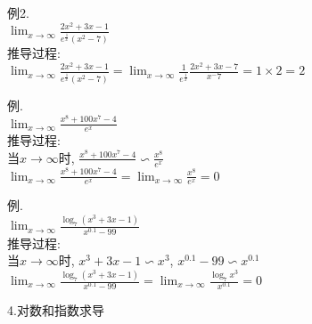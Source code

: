 例2.\\
\phantom{例}$\displaystyle\lim_{x\to\infty}\frac{2x^2+3x-1}{e^{\frac{1}{x}}(x^2-7)}$\\
推导过程:\\
$\displaystyle\lim_{x\to\infty}\frac{2x^2+3x-1}{e^{\frac{1}{x}}(x^2-7)}=\lim_{x\to\infty}\frac{1}{e^{\frac{1}{x}}}\frac{2x^2+3x-7}{x^-7}=1\times2=2$\\

\begin{center}
\end{center}
例.\\
\phantom{例}$\displaystyle\lim_{x\to\infty}\frac{x^8+100x^7-4}{e^x}$\\
推导过程:\\
当$x\to\infty$时, $\displaystyle\frac{x^8+100x^7-4}{}\backsim\frac{x^8}{e^x}$\\
$\displaystyle\lim_{x\to\infty}\frac{x^8+100x^7-4}{e^x}=\lim_{x\to\infty}\frac{x^8}{e^x}=0$\\

\begin{center}
\end{center}
例.\\
\phantom{例}$\displaystyle\lim_{x\to\infty}\frac{\log_7(x^3+3x-1)}{x^{0.1}-99}$\\
推导过程:\\
当$x\to\infty$时, $\displaystyle x^3+3x-1\backsim x^3$, $\displaystyle x^{0.1}-99\backsim x^{0.1}$\\
$\displaystyle\lim_{x\to\infty}\frac{\log_7(x^3+3x-1)}{x^{0.1}-99}=\lim_{x\to\infty}\frac{\log_7x^3}{x^{0.1}}=0$\\

\begin{center}
\end{center}

4.对数和指数求导
\begin{center}
\end{center}
\begin{center}
\end{center}
\begin{center}
\end{center}
\begin{center}
\end{center}

